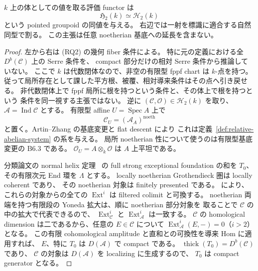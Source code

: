 \begin{proposition}[体上の対象の回復]
\label{prop:relative-h2-field-recovery}
$k$ 上の体としての値を取る評価 functor は
\[
 \mathfrak H_2(k)\simeq\mathcal H_2(k)
\]
という pointed groupoid の同値を与える。
右辺では一射を標識に適合する自然同型で割る。
この主張は任意 noetherian 基底への延長を含まない。
\end{proposition}
\begin{proof}
左から右は (RQ2) の幾何 fiber 条件による。
特に元の定義における全 $D^b(\mathcal C)$ 上の Serre 条件を、
compact 部分だけの相対 Serre 条件から推論していない。
ここで $k$ は代数閉体なので、非空の有限型 fppf chart は $k$-点を持つ。
従って局所存在として課した平方根、被覆、相対導来条件はその点へ引き戻せる。
非代数閉体上で fppf 局所に根を持つという条件と、その体上で根を持つという
条件を同一視する主張ではない。
逆に $(\mathcal C,\mathcal O)\in\mathcal H_2(k)$ を取り、
$\mathcal A=\operatorname{Ind}\mathcal C$ とする。
有限型 affine $U=\operatorname{Spec}A$ 上で
\[
 \mathcal C_U=(\mathcal A_A)^{\mathrm{noeth}}
\]
と置く。Artin--Zhang の基底変更と flat descent により
これは定義~\ref{def:relative-abelian-system} の系を与える。
局所 noetherian 性について使うのは有限型基底変更の B6.3 である。
$\mathcal O_U=A\otimes_k\mathcal O$ は $A$ 上平坦である。

分類論文の normal helix 定理~\cite[normal helix の定理]{QuadricIntrinsic2026} の full strong exceptional foundation の和を
$T_0$、その有限次元 End 環を $\Lambda$ とする。
locally noetherian Grothendieck 圏は locally coherent であり、
その noetherian 対象は finitely presented である。
\cite[Proposition 6.34]{LowenVanDenBergh2006} により、
これらの対象からの全ての $\operatorname{Ext}^i$ は filtered colimit と可換する。
noetherian 両端を持つ有限段の Yoneda 拡大は、順に noetherian 部分対象を
取ることで $\mathcal C$ の中の拡大で代表できるので、
$\operatorname{Ext}^i_{\mathcal C}$ と $\operatorname{Ext}^i_{\mathcal A}$ は一致する。
$\mathcal C$ の homological dimension は二であるから、任意の
$E\in\mathcal C$ について $\operatorname{Ext}^i_{\mathcal A}(E,-)=0$（$i>2$）となる。
この有限 cohomological amplitude と直和との可換性を導来 Hom に適用すれば、
$E$、特に $T_0$ は $D(\mathcal A)$ で compact である。
$\operatorname{thick}(T_0)=D^b(\mathcal C)$ であり、
$\mathcal C$ の対象は $D(\mathcal A)$ を localizing に生成するので、
$T_0$ は compact generator となる。


\end{proof}
